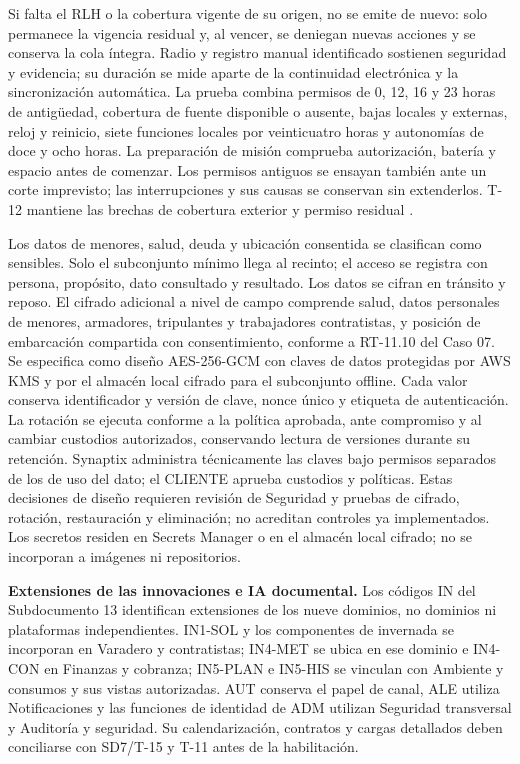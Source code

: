 Si falta el RLH o la cobertura vigente de su origen, no se emite de nuevo: solo permanece la vigencia residual y, al vencer, se deniegan nuevas acciones y se conserva la cola íntegra. Radio y registro manual identificado sostienen seguridad y evidencia; su duración se mide aparte de la continuidad electrónica y la sincronización automática. La prueba combina permisos de 0, 12, 16 y 23 horas de antigüedad, cobertura de fuente disponible o ausente, bajas locales y externas, reloj y reinicio, siete funciones locales por veinticuatro horas y autonomías de doce y ocho horas. La preparación de misión comprueba autorización, batería y espacio antes de comenzar. Los permisos antiguos se ensayan también ante un corte imprevisto; las interrupciones y sus causas se conservan sin extenderlos. T-12 mantiene las brechas de cobertura exterior y permiso residual \parencite[cap.~15, RT-03.10/13 y RT-05.29]{caso07}.

Los datos de menores, salud, deuda y ubicación consentida se clasifican como sensibles. Solo el subconjunto mínimo llega al recinto; el acceso se registra con persona, propósito, dato consultado y resultado. Los datos se cifran en tránsito y reposo. El cifrado adicional a nivel de campo comprende salud, datos personales de menores, armadores, tripulantes y trabajadores contratistas, y posición de embarcación compartida con consentimiento, conforme a RT-11.10 del Caso 07. Se especifica como diseño AES-256-GCM con claves de datos protegidas por AWS KMS y por el almacén local cifrado para el subconjunto offline. Cada valor conserva identificador y versión de clave, nonce único y etiqueta de autenticación. La rotación se ejecuta conforme a la política aprobada, ante compromiso y al cambiar custodios autorizados, conservando lectura de versiones durante su retención. Synaptix administra técnicamente las claves bajo permisos separados de los de uso del dato; el CLIENTE aprueba custodios y políticas. Estas decisiones de diseño requieren revisión de Seguridad y pruebas de cifrado, rotación, restauración y eliminación; no acreditan controles ya implementados. Los secretos residen en Secrets Manager o en el almacén local cifrado; no se incorporan a imágenes ni repositorios.

\textbf{Extensiones de las innovaciones e IA documental.} Los códigos IN del Subdocumento 13 identifican extensiones de los nueve dominios, no dominios ni plataformas independientes. IN1-SOL y los componentes de invernada se incorporan en Varadero y contratistas; IN4-MET se ubica en ese dominio e IN4-CON en Finanzas y cobranza; IN5-PLAN e IN5-HIS se vinculan con Ambiente y consumos y sus vistas autorizadas. AUT conserva el papel de canal, ALE utiliza Notificaciones y las funciones de identidad de ADM utilizan Seguridad transversal y Auditoría y seguridad. Su calendarización, contratos y cargas detallados deben conciliarse con SD7/T-15 y T-11 antes de la habilitación.

